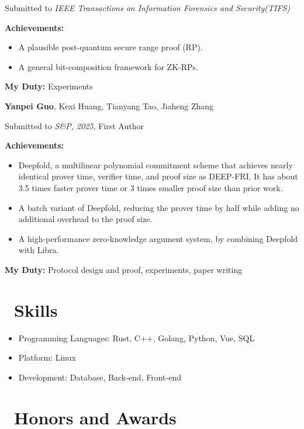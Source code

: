 \documentclass{resume}
\begin{document}
Submitted to \textit{IEEE Transactions on Information Forensics and Security(TIFS)}

\textbf{Achievements:}
\begin{itemize}
  \item A plausible post-quantum secure range proof (RP).
  \item A general bit-composition framework for ZK-RPs.
\end{itemize}
\textbf{My Duty:} Experiments

\textbf{Yanpei Guo}, Kexi Huang, Tianyang Tao, Jiaheng Zhang

Submitted to \textit{S\&P, 2025}, First Author

\textbf{Achievements:}
\begin{itemize}
  \item Deepfold, a multilinear polynomial commitment scheme that achieves nearly identical prover time, verifier time, and proof size as DEEP-FRI.
  It has about 3.5 times faster prover time or 3 times smaller proof size than prior work.
  \item A batch variant of Deepfold, reducing the prover time by half while adding no additional overhead to the proof size.
  \item A high-performance zero-knowledge argument system, by combining Deepfold with Libra.
\end{itemize}
\textbf{My Duty:} Protocol design and proof, experiments, paper writing

\section{\faCogs\ Skills}
\begin{itemize}[parsep=0.5ex]
  \item Programming Languages: Rust, C++, Golang, Python, Vue, SQL
  \item Platform: Linux
  \item Development: Database, Back-end, Front-end
\end{itemize}

\section{\faTrophy\ Honors and Awards}
\end{document}
